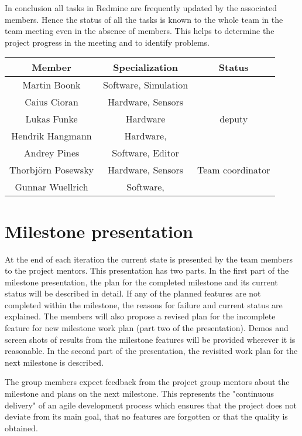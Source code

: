 In conclusion all tasks in Redmine are frequently updated by the associated members.
Hence the status of all the tasks is known to the whole team in the team meeting even in the absence of members.
This helps to determine the project progress in the meeting and to identify problems.

\vspace{1cm}

\begin{center}
\begin{tabular}{c|c|c}
\hline
Member & Specialization & Status \\
\hline
\hline
Martin Boonk & Software, Simulation &  \\ 
\hline
Caius Cioran & Hardware, Sensors &  \\ 
\hline
Lukas Funke & Hardware & deputy \\ 
\hline
Hendrik Hangmann & Hardware, \todo{?} &  \\ 
\hline
Andrey Pines & Software, Editor &  \\ 
\hline
Thorbj\"orn Posewsky & Hardware, Sensors & Team coordinator \\ 
\hline
Gunnar Wuellrich & Software, \todo{?} &  \\ 
\hline 
\end{tabular}
\end{center}

\section{Milestone presentation}

At the end of each iteration the current state is presented by the team members to the project mentors. This presentation has two parts.
In the ﬁrst part of the milestone presentation, the plan for the completed milestone and its current status will be described in detail.
If any of the planned features are not completed within the milestone, the reasons for failure and current status are explained.
The members will also propose a revised plan for the incomplete feature for new milestone work plan (part two of the presentation).
Demos and screen shots of results from the milestone features will be provided wherever it is reasonable.
In the second part of the presentation, the revisited work plan for the next milestone is described.

The group members expect feedback from the project group mentors about the milestone and plans on the next milestone.
This represents the "continuous delivery" of an agile development process which ensures that the project does not deviate from its main goal,
that no features are forgotten or that the quality is obtained.